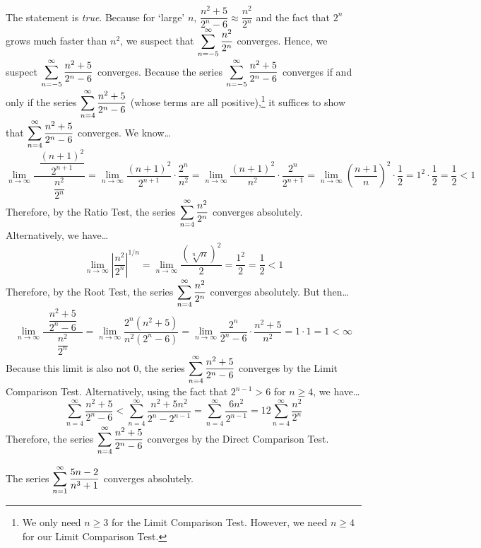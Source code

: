 \documentclass[11pt,letterpaper]{article}
\begin{document}
\sol The statement is \textit{true}. Because for `large' $n$, $\dfrac{n^2 + 5}{2^n - 6} \approx \dfrac{n^2}{2^n}$ and the fact that $2^n$ grows much faster than $n^2$, we suspect that $\displaystyle\sum_{n=-5}^\infty \dfrac{n^2}{2^n}$ converges. Hence, we suspect $\displaystyle\sum_{n= -5}^\infty \dfrac{n^2 + 5}{2^n - 6}$ converges. Because the series $\displaystyle\sum_{n= -5}^\infty \dfrac{n^2 + 5}{2^n - 6}$ converges if and only if the series $\displaystyle\sum_{n= 4}^\infty \dfrac{n^2 + 5}{2^n - 6}$ (whose terms are all positive),\footnote{We only need $n \geq 3$ for the Limit Comparison Test. However, we need $n \geq 4$ for our Limit Comparison Test.} it suffices to show that $\displaystyle\sum_{n= 4}^\infty \dfrac{n^2 + 5}{2^n - 6}$ converges. We know\dots
	\[
	\lim_{n \to \infty} \dfrac{\;\;\dfrac{(n + 1)^2}{2^{n+1}}}{\dfrac{n^2}{2^n}}= \lim_{n \to \infty} \dfrac{(n + 1)^2}{2^{n+1}} \cdot \dfrac{2^n}{n^2}= \lim_{n \to \infty} \dfrac{(n + 1)^2}{n^2} \cdot \dfrac{2^n}{2^{n+1}}= \lim_{n \to \infty} \left( \dfrac{n + 1}{n} \right)^2 \cdot \dfrac{1}{2}= 1^2 \cdot \dfrac{1}{2}= \dfrac{1}{2} < 1
	\]
Therefore, by the Ratio Test, the series $\displaystyle\sum_{n= 4}^\infty \dfrac{n^2}{2^n}$ converges absolutely. Alternatively, we have\dots
	\[
	\lim_{n \to \infty} \left| \dfrac{n^2}{2^n} \right|^{1/n}= \lim_{n \to \infty} \dfrac{(\sqrt[n]{n})^2}{2}= \dfrac{1^2}{2}= \dfrac{1}{2} < 1
	\]
Therefore, by the Root Test, the series $\displaystyle\sum_{n= 4}^\infty \dfrac{n^2}{2^n}$ converges absolutely. But then\dots
	\[
	\lim_{n \to \infty} \dfrac{\;\;\dfrac{n^2 + 5}{2^n - 6}\;\;}{\dfrac{n^2}{2^n}}= \lim_{n \to \infty} \dfrac{2^n(n^2 + 5)}{n^2 (2^n - 6)}= \lim_{n \to \infty} \dfrac{2^n}{2^n - 6} \cdot \dfrac{n^2 + 5}{n^2}= 1 \cdot 1= 1 < \infty
	\]
Because this limit is also not $0$, the series $\displaystyle\sum_{n= 4}^\infty \dfrac{n^2 + 5}{2^n - 6}$ converges by the Limit Comparison Test. Alternatively, using the fact that $2^{n - 1} > 6$ for $n \geq 4$, we have\dots
	\[
	\sum_{n= 4}^\infty \dfrac{n^2 + 5}{2^n - 6} < \sum_{n= 4}^\infty \dfrac{n^2 + 5n^2}{2^n - 2^{n-1}}= \sum_{n= 4}^\infty \dfrac{6n^2}{2^{n-1}}= 12 \sum_{n= 4}^\infty \dfrac{n^2}{2^n}
	\]
Therefore, the series $\displaystyle\sum_{n= 4}^\infty \dfrac{n^2 + 5}{2^n - 6}$ converges by the Direct Comparison Test.



\newpage



 The series $\displaystyle\sum_{n=1}^\infty \dfrac{5n - 2}{n^3 + 1}$ converges absolutely. \pspace
\end{document}
